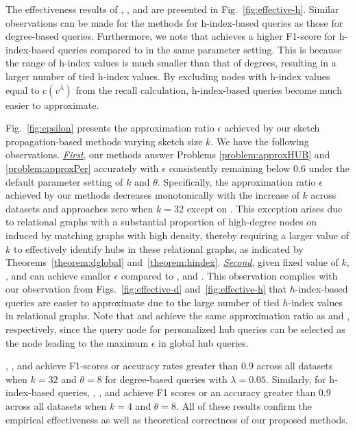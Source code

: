 \vspace{1mm}
The effectiveness results of \gloh, \perh, and \perhe are presented in Fig.~\ref{fig:effective-h}.
Similar observations can be made for the methods for h-index-based \ced queries as those for degree-based \ced queries.
Furthermore, we note that \gloh achieves a higher F1-score for h-index-based \ced queries compared to \glod in the same parameter setting.
This is because the range of h-index values is much smaller than that of degrees, resulting in a larger number of tied h-index values.
By excluding nodes with h-index values equal to $c(v^\lambda)$ from the recall calculation, h-index-based \ced queries become much easier to approximate.

Fig.~\ref{fig:epsilon} presents the approximation ratio $\epsilon$ achieved by our sketch propagation-based methods varying sketch size $k$. We have the following observations. \underline{\textit{First},} our methods answer Problems \ref{problem:approxHUB} and \ref{problem:approxPer} accurately with $\epsilon$ consistently remaining below 0.6 under the default parameter setting of $k$ and $\theta$. Specifically, the approximation ratio $\epsilon$ achieved by our methods decreases monotonically with the increase of $k$ across datasets and approaches zero when $k=32$ except on \dsacm. This exception arises due to relational graphs with a substantial proportion of high-degree nodes on \dsacm induced by matching graphs with high density, thereby requiring a larger value of $k$ to effectively identify hubs in these relational graphs, as indicated by Theorems~\ref{theorem:dglobal} and~\ref{theorem:hindex}. \underline{\textit{Second},} given fixed value of $k$, \gloh, \perh and \perhe can achieve smaller $\epsilon$ compared to \glod, \perd and \perde. This observation complies with our observation from Figs.~\ref{fig:effective-d} and~\ref{fig:effective-h} that $h$-index-based queries are easier to approximate due to the large number of tied $h$-index values in relational graphs. Note that \perd and \perh achieve the same approximation ratio as \glod and \gloh, respectively, since the query node for personalized hub queries can be selected as the node leading to the maximum $\epsilon$ in global hub queries.

\vspace{1mm}
\glod, \perd, and \perde achieve F1-scores or accuracy rates greater than 0.9 across all datasets when $k=32$ and $\theta=8$ for degree-based \ced queries with $\lambda=0.05$.
Similarly, for h-index-based \ced queries, \gloh, \perh, and \perhe achieve F1 scores or an accuracy greater than 0.9 across all datasets when $k=4$ and $\theta=8$.
All of these results confirm the empirical effectiveness as well as theoretical correctness of our proposed methods.

